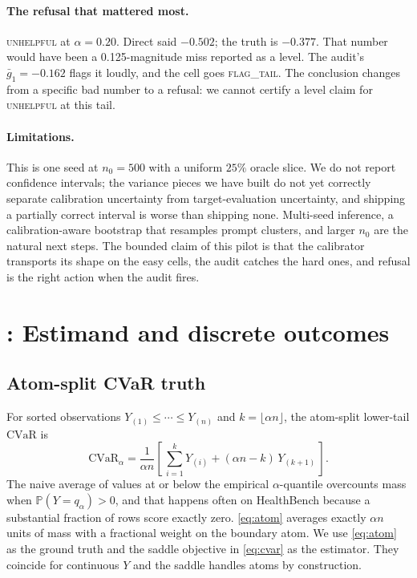 \documentclass[11pt]{article}
\newcommand{\Prob}{\mathbb{P}}
\newcommand{\CVaR}{\mathrm{CVaR}}
\renewcommand{\thefootnote}{\fnsymbol{footnote}}
\begin{document}
\paragraph{The refusal that mattered most.}
\textsc{unhelpful} at $\alpha = 0.20$. Direct said $-0.502$; the
truth is $-0.377$. That number would have been a 0.125-magnitude
miss reported as a level. The audit's $\bar g_1 = -0.162$ flags it
loudly, and the cell goes \textsc{flag\_tail}. The conclusion changes
from a specific bad number to a refusal: we cannot certify a level
claim for \textsc{unhelpful} at this tail.

\paragraph{Limitations.}
This is one seed at $n_0 = 500$ with a uniform $25\%$ oracle slice. We
do not report confidence intervals; the variance pieces we have built
do not yet correctly separate calibration uncertainty from
target-evaluation uncertainty, and shipping a partially correct
interval is worse than shipping none. Multi-seed inference, a
calibration-aware bootstrap that resamples prompt clusters, and larger
$n_0$ are the natural next steps. The bounded claim of this pilot is
that the calibrator transports its shape on the easy cells, the audit
catches the hard ones, and refusal is the right action when the audit
fires.

\appendix
\renewcommand{\thesection}{Appendix \Alph{section}}
\renewcommand{\thefootnote}{\arabic{footnote}}
\setcounter{footnote}{0}

\section{: Estimand and discrete outcomes}
\label{app:estimand}

\subsection{Atom-split CVaR truth}
\label{app:atom}

For sorted observations $Y_{(1)} \le \cdots \le Y_{(n)}$ and $k =
\lfloor \alpha n \rfloor$, the atom-split lower-tail $\CVaR$ is
\begin{equation}
\CVaR_\alpha = \frac{1}{\alpha n}\left[\,
\sum_{i=1}^{k} Y_{(i)} + (\alpha n - k)\, Y_{(k+1)} \,\right].
\label{eq:atom}
\end{equation}
The naive average of values at or below the empirical $\alpha$-quantile
overcounts mass when $\Prob(Y = q_\alpha) > 0$, and that happens often
on HealthBench because a substantial fraction of rows score exactly
zero. \eqref{eq:atom} averages exactly $\alpha n$ units of mass with a
fractional weight on the boundary atom. We use \eqref{eq:atom} as the
ground truth and the saddle objective in \eqref{eq:cvar} as the
estimator. They coincide for continuous $Y$ and the saddle handles
atoms by construction.
\end{document}
